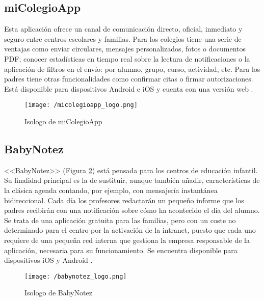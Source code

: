 \subsection{miColegioApp}
Esta aplicación ofrece un canal de comunicación directo, oficial, inmediato y seguro entre centros escolares y familias. Para los colegios tiene una serie de ventajas como enviar circulares, mensajes personalizados, fotos o documentos \acs{PDF}; conocer estadísticas en tiempo real sobre la lectura de notificaciones o la aplicación de filtros en el envío: por alumno, grupo, curso, actividad, etc. Para los padres tiene otras funcionalidades como confirmar citas o firmar autorizaciones. Está disponible para dispositivos Android e iOS y cuenta con una versión web \cite{creaTactil}.

\begin{figure}[!h]
	\begin{center}
		\texttt{[image: /micolegioapp\_logo.png]}
		\caption{Isologo de miColegioApp}
		\label{fig:micolegioapp}
	\end{center}
\end{figure}

\subsection{BabyNotez}
<<BabyNotez>> (Figura \ref{fig:babynotez}) está pensada para los centros de educación infantil. Su finalidad principal es la de sustituir, aunque también añadir, características de la clásica agenda contando, por ejemplo, con mensajería instantánea bidireccional. Cada día los profesores redactarán un pequeño informe que los padres recibirán con una notificación sobre cómo ha acontecido el día del alumno. Se trata de una aplicación gratuita para las familias, pero con un coste no determinado para el centro por la activación de la intranet, puesto que cada uno requiere de una pequeña red interna que gestiona la empresa responsable de la aplicación, necesaria para su funcionamiento. Se encuentra disponible para dispositivos iOS y Android \cite{Educo2016}.

\begin{figure}[!h]
	\begin{center}
		\texttt{[image: /babynotez\_logo.png]}
		\caption{Isologo de BabyNotez}
		\label{fig:babynotez}
	\end{center}
\end{figure}

\newpage

